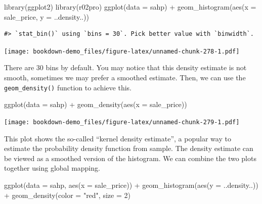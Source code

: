 \documentclass[
]{book}
\newenvironment{Shaded}{\begin{snugshade}}{\end{snugshade}}
\newcommand{\AttributeTok}[1]{\textcolor[rgb]{0.77,0.63,0.00}{#1}}
\newcommand{\DecValTok}[1]{\textcolor[rgb]{0.00,0.00,0.81}{#1}}
\newcommand{\FunctionTok}[1]{\textcolor[rgb]{0.00,0.00,0.00}{#1}}
\newcommand{\NormalTok}[1]{#1}
\newcommand{\SpecialCharTok}[1]{\textcolor[rgb]{0.00,0.00,0.00}{#1}}
\newcommand{\StringTok}[1]{\textcolor[rgb]{0.31,0.60,0.02}{#1}}
\begin{document}
\begin{Shaded}
\begin{Highlighting}[]
\FunctionTok{library}\NormalTok{(ggplot2)}
\FunctionTok{library}\NormalTok{(r02pro)}
\FunctionTok{ggplot}\NormalTok{(}\AttributeTok{data =}\NormalTok{ sahp) }\SpecialCharTok{+}  \FunctionTok{geom\_histogram}\NormalTok{(}\FunctionTok{aes}\NormalTok{(}\AttributeTok{x =}\NormalTok{ sale\_price, }\AttributeTok{y =}\NormalTok{ ..density..))}
\end{Highlighting}
\end{Shaded}

\begin{verbatim}
#> `stat_bin()` using `bins = 30`. Pick better value with `binwidth`.
\end{verbatim}

\texttt{[image: bookdown-demo\_files/figure-latex/unnamed-chunk-278-1.pdf]}

There are 30 bins by default. You may notice that this density estimate is not smooth, sometimes we may prefer a smoothed estimate. Then, we can use the \texttt{geom\_density()} function to achieve this.

\begin{Shaded}
\begin{Highlighting}[]
\FunctionTok{ggplot}\NormalTok{(}\AttributeTok{data =}\NormalTok{ sahp) }\SpecialCharTok{+} \FunctionTok{geom\_density}\NormalTok{(}\FunctionTok{aes}\NormalTok{(}\AttributeTok{x =}\NormalTok{ sale\_price))}
\end{Highlighting}
\end{Shaded}

\texttt{[image: bookdown-demo\_files/figure-latex/unnamed-chunk-279-1.pdf]}

This plot shows the so-called ``kernel density estimate'', a popular way to estimate the probability density function from sample. The density estimate can be viewed as a smoothed version of the histogram. We can combine the two plots together using global mapping.

\begin{Shaded}
\begin{Highlighting}[]
\FunctionTok{ggplot}\NormalTok{(}\AttributeTok{data =}\NormalTok{ sahp, }\FunctionTok{aes}\NormalTok{(}\AttributeTok{x =}\NormalTok{ sale\_price)) }\SpecialCharTok{+}
  \FunctionTok{geom\_histogram}\NormalTok{(}\FunctionTok{aes}\NormalTok{(}\AttributeTok{y =}\NormalTok{ ..density..)) }\SpecialCharTok{+}
  \FunctionTok{geom\_density}\NormalTok{(}\AttributeTok{color =} \StringTok{"red"}\NormalTok{, }\AttributeTok{size =} \DecValTok{2}\NormalTok{)}
\end{Highlighting}
\end{Shaded}
\end{document}
